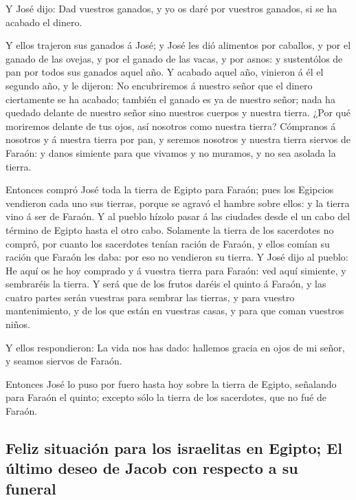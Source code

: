  Y José dijo: Dad vuestros ganados, y yo os daré por
vuestros ganados, si se ha acabado el dinero.

 Y ellos trajeron sus ganados á José; y José les dió
alimentos por caballos, y por el ganado de las ovejas, y por el ganado
de las vacas, y por asnos: y sustentólos de pan por todos sus ganados
aquel año.  Y acabado aquel año, vinieron á él el segundo
año, y le dijeron: No encubriremos á nuestro señor que el dinero
ciertamente se ha acabado; también el ganado es ya de nuestro señor;
nada ha quedado delante de nuestro señor sino nuestros cuerpos y nuestra
tierra.  ¿Por qué moriremos delante de tus ojos, así
nosotros como nuestra tierra? Cómpranos á nosotros y á nuestra tierra
por pan, y seremos nosotros y nuestra tierra siervos de Faraón: y danos
simiente para que vivamos y no muramos, y no sea asolada la tierra.

 Entonces compró José toda la tierra de Egipto para
Faraón; pues los Egipcios vendieron cada uno sus tierras, porque se
agravó el hambre sobre ellos: y la tierra vino á ser de Faraón.
 Y al pueblo hízolo pasar á las ciudades desde el un cabo
del término de Egipto hasta el otro cabo.  Solamente la
tierra de los sacerdotes no compró, por cuanto los sacerdotes tenían
ración de Faraón, y ellos comían su ración que Faraón les daba: por eso
no vendieron su tierra.  Y José dijo al pueblo: He aquí
os he hoy comprado y á vuestra tierra para Faraón: ved aquí simiente, y
sembraréis la tierra.  Y será que de los frutos daréis el
quinto á Faraón, y las cuatro partes serán vuestras para sembrar las
tierras, y para vuestro mantenimiento, y de los que están en vuestras
casas, y para que coman vuestros niños.

 Y ellos respondieron: La vida nos has dado: hallemos
gracia en ojos de mi señor, y seamos siervos de Faraón.

 Entonces José lo puso por fuero hasta hoy sobre la
tierra de Egipto, señalando para Faraón el quinto; excepto sólo la
tierra de los sacerdotes, que no fué de Faraón.

\hypertarget{feliz-situaciuxf3n-para-los-israelitas-en-egipto-el-uxfaltimo-deseo-de-jacob-con-respecto-a-su-funeral}{%
\subsection{Feliz situación para los israelitas en Egipto; El último
deseo de Jacob con respecto a su
funeral}\label{feliz-situaciuxf3n-para-los-israelitas-en-egipto-el-uxfaltimo-deseo-de-jacob-con-respecto-a-su-funeral}}

